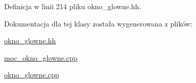Definicja w linii 214 pliku okno\+\_\+glowne.\+hh.



Dokumentacja dla tej klasy została wygenerowana z plików\+:\begin{DoxyCompactItemize}
\item 
\hyperlink{okno__glowne_8hh}{okno\+\_\+glowne.\+hh}\item 
\hyperlink{moc__okno__glowne_8cpp}{moc\+\_\+okno\+\_\+glowne.\+cpp}\item 
\hyperlink{okno__glowne_8cpp}{okno\+\_\+glowne.\+cpp}\end{DoxyCompactItemize}
